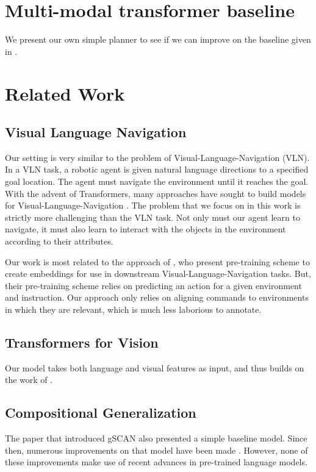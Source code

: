 \documentclass[11pt]{article}
\begin{document}
\section{Multi-modal transformer baseline}
\label{transformer-planner}
We present our own simple planner to see if we can improve on the baseline given in \cite{ruis2020benchmark}.

\section{Related Work}
\subsection{Visual Language Navigation}
Our setting is very similar to the problem of Visual-Language-Navigation (VLN). 
%
In a VLN task, a robotic agent is given natural language directions to a specified goal location. 
%
The agent must navigate the environment until it reaches the goal.
%
With the advent of Transformers, many approaches have sought to build models for Visual-Language-Navigation \citep{magassouba2021crossmap, fang2019scene, Chen2020TopologicalPW}.
%
The problem that we focus on in this work is strictly more challenging than the VLN task. 
%
Not only must our agent learn to navigate, it must also learn to interact with the objects in the environment according to their attributes.

%
Our work is most related to the approach of \citet{Hao2020TowardsLA}, who present pre-training scheme to create embeddings for use in downstream Visual-Language-Navigation tasks.
%
But, their pre-training scheme relies on predicting an action for a given environment and instruction.
%
Our approach only relies on aligning commands to environments in which they are relevant, which is much less laborious to annotate.
%

\subsection{Transformers for Vision}
Our model takes both language and visual features as input, and thus builds on the work of \citep{LuViLBERT2019, tan-bansal-2019-lxmert, LiVisualBert2019}.

\subsection{Compositional Generalization}
The paper \citep{ruis2020benchmark} that introduced gSCAN also presented a simple baseline model.
%
Since then, numerous improvements on that model have been made \citep{gao-etal-2020-systematic, heinze-think-2020, kuo2020compositional}.
%
However, none of these improvements make use of recent advances in pre-trained language models. 
\end{document}
